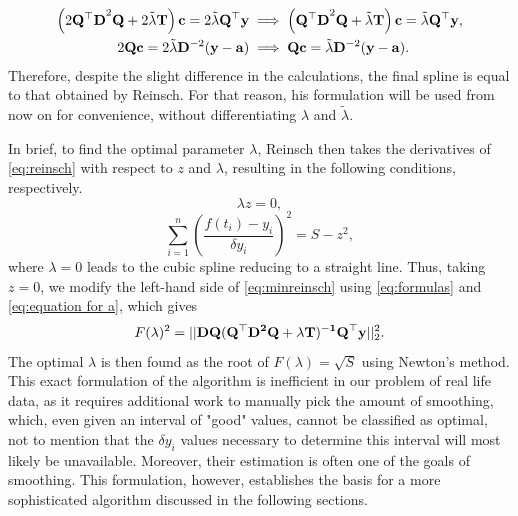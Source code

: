 \documentclass[11pt,leqno]{book}
\theoremstyle{definition}
\theoremstyle{plain}
\theoremstyle{definition}
\begin{document}
{\[\begin{aligned}
\left(2\vb{Q^\top  D}^2\vb{Q} + 2\tilde \lambda \vb{T}\right)\vb{c} = 2\tilde \lambda \vb{Q}^\top\vb{y} &\implies \left(\vb{Q^\top  D}^2\vb{Q} +\tilde \lambda \vb{T}\right)\vb{c} = \tilde\lambda \vb{Q}^\top\vb{y},\\
2\vb{Qc}=2\tilde\lambda \vb{D}^{-2}(\vb{y}-\vb{a}) &\implies \vb{Qc}=\tilde\lambda \vb{D}^{-2}(\vb{y}-\vb{a}).
\end{aligned}
\]
 Therefore, despite the slight difference in the calculations, the final spline is equal to that obtained by Reinsch. For that reason, his formulation will be used from now on for convenience, without differentiating $\lambda$ and $\tilde\lambda.$
 
\indent In brief, to find the optimal parameter $\lambda$, Reinsch then takes the derivatives of \eqref{eq:reinsch} with respect to $z$ and $\lambda$, resulting in the following conditions, respectively. \begin{equation*}
\lambda z = 0,
\end{equation*}
\begin{equation}
\sum_{i=1}^{n}\left(\frac{f(t_i) - {y}_i}{{\delta}{y}_i}\right)^2 = S - z^2,
\label{eq:minreinsch}
\end{equation}
 where $\lambda=0$ leads to the cubic spline reducing to a straight line. Thus, taking $z=0$, we modify the left-hand side of \eqref{eq:minreinsch} using \eqref{eq:formulas} and \eqref{eq:equation for a}, which gives
 \begin{equation*}
F(\lambda)^2=||\vb{DQ(Q^\top D^2Q+\lambda T)^{-1}Q^\top y}||_2^2.
 \end{equation*}
 The optimal $\lambda$ is then found as the root of $F(\lambda)=\sqrt{S}$ using Newton's method. This exact formulation of the algorithm is inefficient in our problem of real life data, as it requires additional work to manually pick the amount of smoothing, which, even given an interval of "good" values, cannot be classified as optimal, not to mention that the $\delta y_i$ values necessary to determine this interval will most likely be unavailable. Moreover, their estimation is often one of the goals of smoothing. This formulation, however, establishes the basis for a more sophisticated algorithm discussed in the following sections.
}
\end{document}
